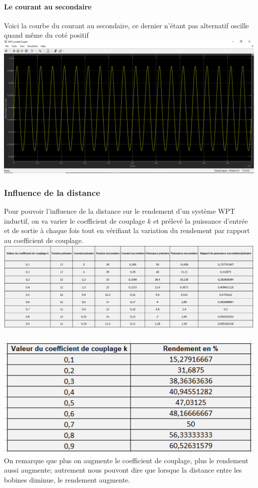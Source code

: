 \documentclass[12pt,a4paper,titlepage,notitlepage]{article}
\begin{document}
	\paragraph{Le courant au secondaire\\}
	Voici la courbe du courant au secondaire, ce dernier n'étant pas alternatif oscille quand même du coté positif\\ 
	\includegraphics[width=1\textwidth]{WPT_simul_sc}
	
	\subsubsection*{Influence de la distance}
	Pour pouvoir l'influence de la distance sur le rendement d'un système WPT inductif, on va varier le coefficient de couplage $k$ et prélevé la puissance d'entrée et de sortie à chaque fois tout en vérifiant la variation du rendement par rapport au coefficient de couplage.\\
	\includegraphics[width=1\textwidth]{WPT_simul_gain}\\
	
	\
	\\
	\includegraphics[width=1\textwidth]{WPT_simul_gain1}\\
	On remarque que plus on augmente le coefficient de couplage, plus le rendement aussi augmente; autrement nous pouvont dire que lorsque la distance entre les bobines diminue, le rendement augmente. 
	
\end{document}
